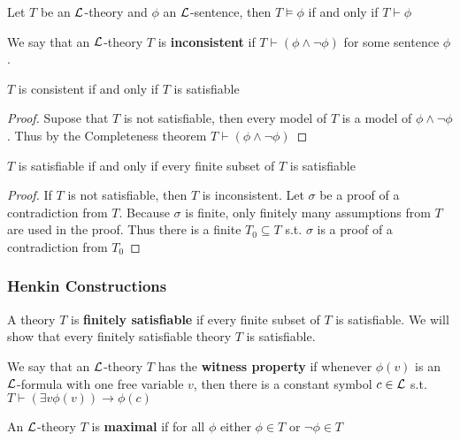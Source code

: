 \documentclass[11pt]{article}
\begin{document}
\begin{theorem}
Let \(T\) be an \(\mathcal{L}\)-theory and \(\phi\) an \(\mathcal{L}\)-sentence, then
\(T\models\phi\) if and only if \(T\vdash \phi\)
\end{theorem}

We say that an \(\mathcal{L}\)-theory \(T\) is \textbf{inconsistent} if
\(T\vdash(\phi\wedge\neg\phi)\) for some sentence \(\phi\).

\begin{corollary}[]
\(T\) is consistent if and only if \(T\) is satisfiable
\end{corollary}

\begin{proof}
Supose that \(T\) is not satisfiable, then every model of \(T\) is a model of
\(\phi\wedge\neg\phi\). Thus by the Completeness theorem
\(T\vdash(\phi\wedge\neg\phi)\) 
\end{proof}


\begin{theorem}
\(T\) is satisfiable if and only if every finite subset of \(T\) is satisfiable
\end{theorem}

\begin{proof}
If \(T\) is not satisfiable, then \(T\) is inconsistent. Let \(\sigma\) be a proof of
a contradiction from  \(T\). Because \(\sigma\) is finite, only finitely many
assumptions from \(T\) are used in the proof. Thus there is a finite
\(T_0\subseteq T\) s.t. \(\sigma\) is a proof of a contradiction from \(T_0\)
\end{proof}

\subsubsection{Henkin Constructions}
\label{sec:orge599240}
A theory \(T\) is \textbf{finitely satisfiable} if every finite subset of \(T\) is
satisfiable. We will show that every finitely satisfiable theory \(T\) is
satisfiable.

\begin{definition}[]
We say that an \(\mathcal{L}\)-theory \(T\) has the \textbf{witness property} if whenever
\(\phi(v)\) is an \(\mathcal{L}\)-formula with one free variable \(v\), then there is
a constant symbol \(c\in\mathcal{L}\) s.t. \(T\vdash(\exists v\phi(v))\to\phi(c)\)

An \(\mathcal{L}\)-theory \(T\) is \textbf{maximal} if for all \(\phi\) either \(\phi\in T\) or
\(\neg\phi\in T\)
\end{definition}
\end{document}
